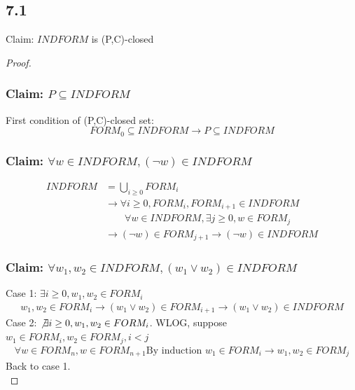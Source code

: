 \documentclass{article}
\begin{document}
\subsection*{7.1}
Claim: $INDFORM$ is (P,C)-closed
\begin{proof}
    \subsubsection*{Claim: $P \subseteq INDFORM$}
    First condition of (P,C)-closed set:
    \[FORM_0 \subseteq INDFORM \rightarrow P \subseteq INDFORM\]
    \subsubsection*{Claim: $\forall w \in INDFORM, (\neg w) \in INDFORM$}
    \begin{align*}
        INDFORM &= \bigcup_{i\geq 0} FORM_i \\
        &\rightarrow \forall i \geq 0, FORM_i, FORM_{i+1} \in INDFORM\\
        &\qquad \forall w \in INDFORM, \exists j \geq 0, w \in FORM_j \\
        &\rightarrow (\neg w) \in FORM_{j+1} \rightarrow (\neg w) \in INDFORM
    \end{align*}
    \subsubsection*{Claim: $\forall w_1, w_2 \in INDFORM, (w_1 \lor w_2) \in INDFORM$}
    Case 1: $\exists i \geq 0, w_1, w_2 \in FORM_i$
    \begin{align*}
        w_1, w_2 \in FORM_i \rightarrow (w_1 \lor w_2) \in FORM_{i+1} \rightarrow (w_1 \lor w_2) \in INDFORM
    \end{align*}
    Case 2: $\not\exists i \geq 0, w_1, w_2 \in FORM_i$.
    WLOG, suppose $w_1 \in FORM_i, w_2 \in FORM_j, i < j$
    \begin{align*}
        \forall w \in FORM_n, w \in FORM_{n+1}
        \text{By induction } w_1 \in FORM_i \rightarrow w_1, w_2 \in FORM_j
    \end{align*}
    Back to case 1.\\
\end{proof}
\end{document}
